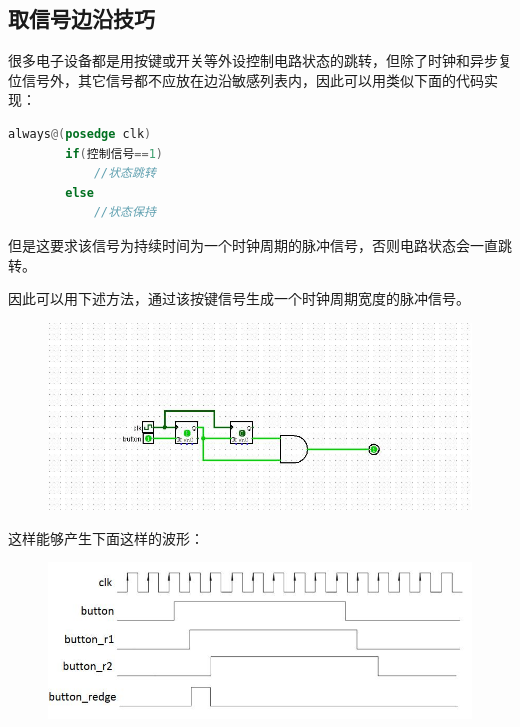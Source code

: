 \documentclass[UTF8]{article}
\begin{document}
	\subsection{取信号边沿技巧}
	很多电子设备都是用按键或开关等外设控制电路状态的跳转，但除了时钟和异步复位信号外，其它信号都不应放在边沿敏感列表内，因此可以用类似下面的代码实现：\par
	\begin{lstlisting}[language=Verilog]
	always@(posedge clk)
		if(控制信号==1)
			//状态跳转
		else
			//状态保持
	\end{lstlisting}\par
	但是这要求该信号为持续时间为一个时钟周期的脉冲信号，否则电路状态会一直跳转。 \par
	因此可以用下述方法，通过该按键信号生成一个时钟周期宽度的脉冲信号。\par
	\begin{figure}[H]
		\centering
		\includegraphics[width=1\linewidth]{s2_1.jpg}
		\label{s2_1}
	\end{figure}\par
	这样能够产生下面这样的波形：\par
	\begin{figure}[H]
		\centering
		\includegraphics[width=1\linewidth]{s2_2.jpg}
		\label{s2_2}
	\end{figure}\par
\end{document}
